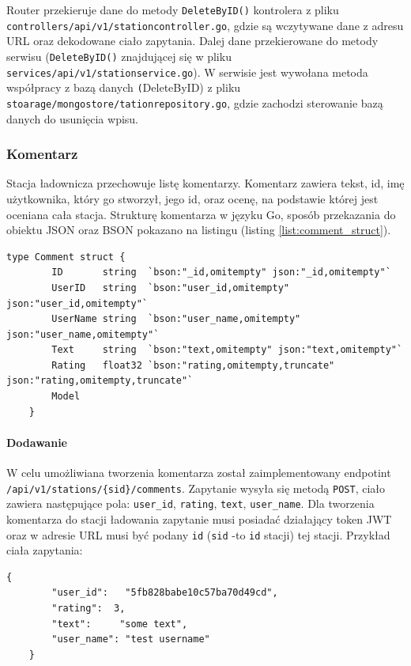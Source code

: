 Router przekieruje dane do metody \texttt{DeleteByID()} kontrolera z pliku \texttt{controllers/api/v1/stationcontroller.go}, gdzie są wczytywane dane z adresu URL oraz dekodowane ciało zapytania. Dalej dane przekierowane do metody serwisu (\texttt{DeleteByID()} znajdującej się w pliku \texttt{services/api/v1/stationservice.go}).
W serwisie jest wywołana metoda współpracy z bazą danych \texttt(DeleteByID) z pliku \texttt{stoarage/mongostore/tationrepository.go}, gdzie zachodzi sterowanie bazą danych do usunięcia wpisu.
\subsubsection{Komentarz}
Stacja ładownicza przechowuje listę komentarzy. Komentarz zawiera tekst, id, imę użytkownika, który go stworzył, jego id, oraz ocenę, na podstawie której jest oceniana cała stacja.
Strukturę komentarza w języku Go, sposób przekazania do obiektu JSON oraz BSON pokazano na listingu (listing \ref{list:comment_struct}).
\begin{lstlisting}[label=list:comment_struct,caption=Struktura komentarza,basicstyle=\tiny\ttfamily]
    type Comment struct {
        ID       string  `bson:"_id,omitempty" json:"_id,omitempty"`
        UserID   string  `bson:"user_id,omitempty" json:"user_id,omitempty"`
        UserName string  `bson:"user_name,omitempty" json:"user_name,omitempty"`
        Text     string  `bson:"text,omitempty" json:"text,omitempty"`
        Rating   float32 `bson:"rating,omitempty,truncate" json:"rating,omitempty,truncate"`
        Model
    }
\end{lstlisting}

\paragraph{Dodawanie\newline}
W celu umożliwiana tworzenia komentarza został zaimplementowany endpotint \texttt{/api/v1/stations/\{sid\}/comments}.
Zapytanie wysyła się metodą \texttt{POST}, ciało zawiera następujące pola: \texttt{user\_id}, \texttt{rating}, \texttt{text}, \texttt{user\_name}.
Dla tworzenia komentarza do stacji ładowania zapytanie musi posiadać działający token JWT oraz w adresie URL musi być podany \texttt{id} (\texttt{sid} -to \texttt{id} stacji) tej stacji.
Przykład ciała zapytania:
\begin{lstlisting}[basicstyle=\tiny\ttfamily]
    {
		"user_id":   "5fb828babe10c57ba70d49cd",
		"rating":  3,
		"text":     "some text",
		"user_name": "test username"
    }
\end{lstlisting}

